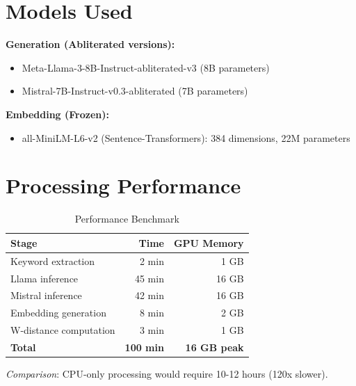 \documentclass[12pt,a4paper]{report}
\begin{document}
\section*{Models Used}

\textbf{Generation (Abliterated versions):}
\begin{itemize}
    \item Meta-Llama-3-8B-Instruct-abliterated-v3 (8B parameters)
    \item Mistral-7B-Instruct-v0.3-abliterated (7B parameters)
\end{itemize}

\textbf{Embedding (Frozen):}
\begin{itemize}
    \item all-MiniLM-L6-v2 (Sentence-Transformers): 384 dimensions, 22M parameters
\end{itemize}

\section*{Processing Performance}

\begin{table}[H]
\centering
\begin{tabular}{lrr}
\toprule
\textbf{Stage} & \textbf{Time} & \textbf{GPU Memory} \\
\midrule
Keyword extraction & 2 min & 1 GB \\
Llama inference & 45 min & 16 GB \\
Mistral inference & 42 min & 16 GB \\
Embedding generation & 8 min & 2 GB \\
W-distance computation & 3 min & 1 GB \\
\midrule
\textbf{Total} & \textbf{100 min} & \textbf{16 GB peak} \\
\bottomrule
\end{tabular}
\caption{Performance Benchmark}
\end{table}

\textit{Comparison}: CPU-only processing would require 10-12 hours (120x slower).
\end{document}
